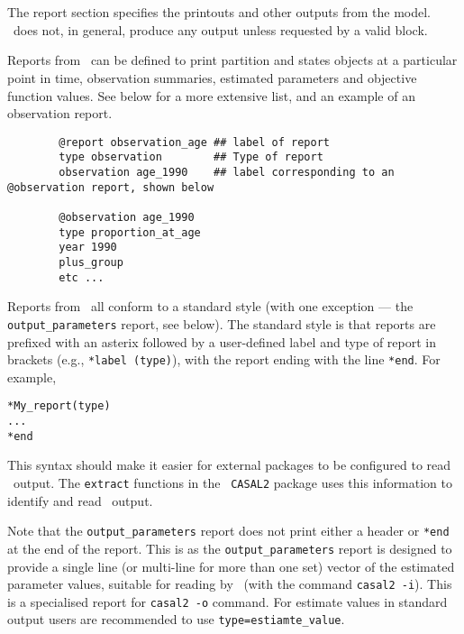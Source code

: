 \section{\label{sec:report-section}}
The report section specifies the printouts and other outputs from the model. \CNAME\ does not, in general, produce any output unless requested by a valid  block. 

Reports from \CNAME\ can be defined to print partition and states objects at a particular point in time, observation summaries, estimated parameters and objective function values. See below for a more extensive list, and an example of an observation report.

{\small{\begin{verbatim}
		@report observation_age ## label of report
		type observation		## Type of report
		observation age_1990	## label corresponding to an @observation report, shown below
		
		@observation age_1990
		type proportion_at_age
		year 1990
		plus_group
		etc ...
		\end{verbatim}}}

Reports from \CNAME\ all conform to a standard style (with one exception --- the \texttt{output\_parameters} report, see below). The standard style is that reports are prefixed with an asterix followed by a user-defined label and type of report in brackets (e.g., \texttt{*label (type)}), with the report ending with the line \texttt{*end}. For example,

\begin{verbatim} 
*My_report(type)
...
*end
\end{verbatim}


This syntax should make it easier for external packages to be configured to read \CNAME\ output. The \texttt{extract} functions in the \R\ \texttt{CASAL2} package uses this information to identify and read \CNAME\ output.

Note that the \texttt{output\_parameters} report does not print either a header or \texttt{*end} at the end of the report. This is as the \texttt{output\_parameters} report is designed to provide a single line (or multi-line for more than one set) vector of the estimated parameter values, suitable for reading by \CNAME\ (with the command \texttt{casal2 -i}). This is a specialised report for \texttt{casal2 -o} command. For estimate values in standard output users are recommended to use \texttt{type=estiamte\_value}.

